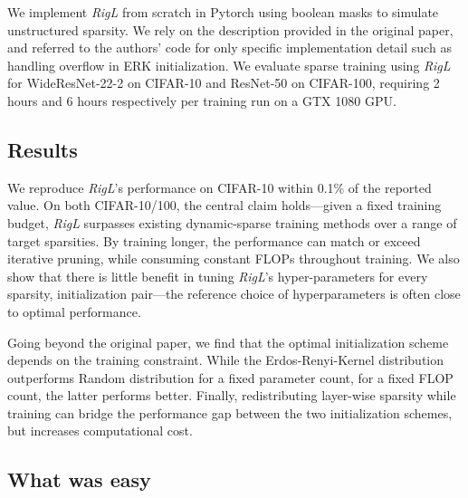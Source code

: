 We implement \textit{RigL} from scratch in Pytorch using boolean masks to simulate unstructured sparsity. We rely on the description provided in the original paper, and referred to the authors' code for only specific implementation detail such as handling overflow in ERK initialization. We evaluate sparse training using \textit{RigL} for WideResNet-22-2 on CIFAR-10 and ResNet-50 on CIFAR-100, requiring 2 hours and 6 hours respectively per training run on a GTX 1080 GPU.

\subsection*{Results}


We reproduce \textit{RigL}'s performance on CIFAR-10 within 0.1\% of the reported value. On both CIFAR-10/100, the central claim holds---given a fixed training budget, \textit{RigL} surpasses existing dynamic-sparse training methods over a range of target sparsities. By training longer, the performance can match or exceed iterative pruning, while consuming constant FLOPs throughout training. We also show that there is little benefit in tuning \textit{RigL}'s hyper-parameters for every sparsity, initialization pair---the reference choice of hyperparameters is often close to optimal performance. 

Going beyond the original paper, we find that the optimal initialization scheme depends on the training constraint. While the Erdos-Renyi-Kernel distribution outperforms Random distribution for a fixed parameter count, for a fixed FLOP count, the latter performs better. Finally, redistributing layer-wise sparsity while training can bridge the performance gap between the two initialization schemes, but increases computational cost.

\subsection*{What was easy}

